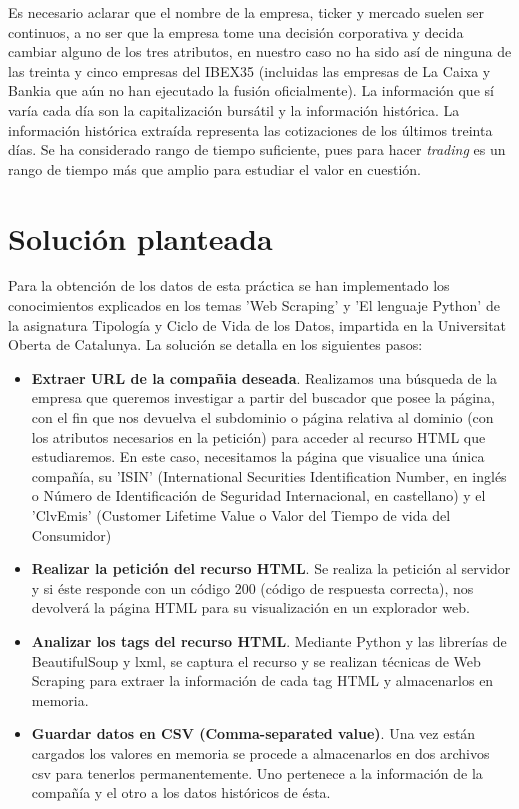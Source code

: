 \documentclass[12pt]{article}
\begin{document}
\begin{itemize}
	Es necesario aclarar que el nombre de la empresa, ticker y mercado suelen ser continuos, a no ser que la empresa tome una decisión corporativa y decida cambiar alguno de los tres atributos, en nuestro caso no ha sido así de ninguna de las treinta y cinco empresas del IBEX35 (incluidas las empresas de La Caixa y Bankia que aún no han ejecutado la fusión oficialmente). La información que sí varía cada día son la capitalización bursátil y la información histórica. La información histórica extraída representa las cotizaciones de los últimos treinta días. Se ha considerado rango de tiempo suficiente, pues para hacer \textit{trading} es un rango de tiempo más que amplio para estudiar el valor en cuestión.
\end{itemize}

\section*{Solución planteada}
Para la obtención de los datos de esta práctica se han implementado los conocimientos explicados en los temas 'Web Scraping' y 'El lenguaje Python' de la asignatura Tipología y Ciclo de Vida de los Datos, impartida en la Universitat Oberta de Catalunya.
La solución se detalla en los siguientes pasos:
\begin{itemize}
	\item \textbf{Extraer URL de la compañia deseada}. Realizamos una búsqueda de la empresa que queremos investigar a partir del buscador que posee la página, con el fin que nos devuelva el subdominio o página relativa al dominio (con los atributos necesarios en la petición) para acceder al recurso HTML que estudiaremos. En este caso, necesitamos la página que visualice una única compañía, su 'ISIN' (International Securities Identification Number, en inglés o Número de Identificación de Seguridad Internacional, en castellano) y el 'ClvEmis' (Customer Lifetime Value o Valor del Tiempo de vida del Consumidor)
	
	\item \textbf{Realizar la petición del recurso HTML}. Se realiza la petición al servidor y si éste responde con un código 200 (código de respuesta correcta), nos devolverá la página HTML para su visualización en un explorador web.
	\item \textbf{Analizar los tags del recurso HTML}. Mediante Python y las librerías de BeautifulSoup y lxml, se captura el recurso y se realizan técnicas de Web Scraping para extraer la información de cada tag HTML y almacenarlos en memoria.
	\item \textbf{Guardar datos en CSV (Comma-separated value)}. Una vez están cargados los valores en memoria se procede a almacenarlos en dos archivos csv para tenerlos permanentemente. Uno pertenece a la información de la compañía y el otro a los datos históricos de ésta.
\end{itemize}
\end{document}
